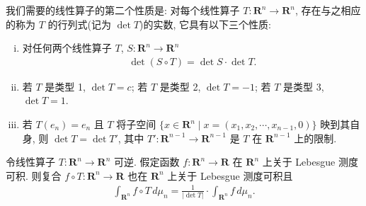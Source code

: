 \documentclass[../../main.tex]{subfiles}
\begin{document}
我们需要的线性算子的第二个性质是: 对每个线性算子 $T:\mathbf{R}^{n}\to\mathbf{R}^{n}$, 存在与之相应的称为 $T$ 的行列式(记为 $\det T$)的实数, 它具有以下三个性质:
\begin{enumerate}[(i)]
\item 对任何两个线性算子 $T$, $S:\mathbf{R}^{n}\to\mathbf{R}^{n}$
\begin{align}\label{align:ch20-行列式乘性}
\det(S\circ T)=\det S\cdot\det T.
\end{align}
\item 若 $T$ 是类型 1, $\det T=c$; 若 $T$ 是类型 2, $\det T=-1$; 若 $T$ 是类型 3, $\det T=1$.
\item 若 $T(e_{n})=e_{n}$ 且 $T$ 将子空间 $\{x\in\mathbf{R}^{n}\mid x=(x_{1},x_{2},\cdots,x_{n-1},0)\}$ 映到其自身, 则 $\det T=\det T'$, 其中 $T':\mathbf{R}^{n-1}\to\mathbf{R}^{n-1}$ 是 $T$ 在 $\mathbf{R}^{n-1}$ 上的限制.
\end{enumerate}

\begin{theorem}\label{theorem:ch20-换元公式}
令线性算子 $T:\mathbf{R}^{n}\to\mathbf{R}^{n}$ 可逆. 假定函数 $f:\mathbf{R}^{n}\to\mathbf{R}$ 在 $\mathbf{R}^{n}$ 上关于 Lebesgue 测度可积. 则复合 $f\circ T:\mathbf{R}^{n}\to\mathbf{R}$ 也在 $\mathbf{R}^{n}$ 上关于 Lebesgue 测度可积且
\begin{align}\label{align:ch20-一般换元}
\int_{\mathbf{R}^{n}}f\circ T\,d\mu_{n}=\frac{1}{|\det T|}\cdot\int_{\mathbf{R}^{n}}f\,d\mu_{n}.
\end{align}
\end{theorem}
\end{document}
